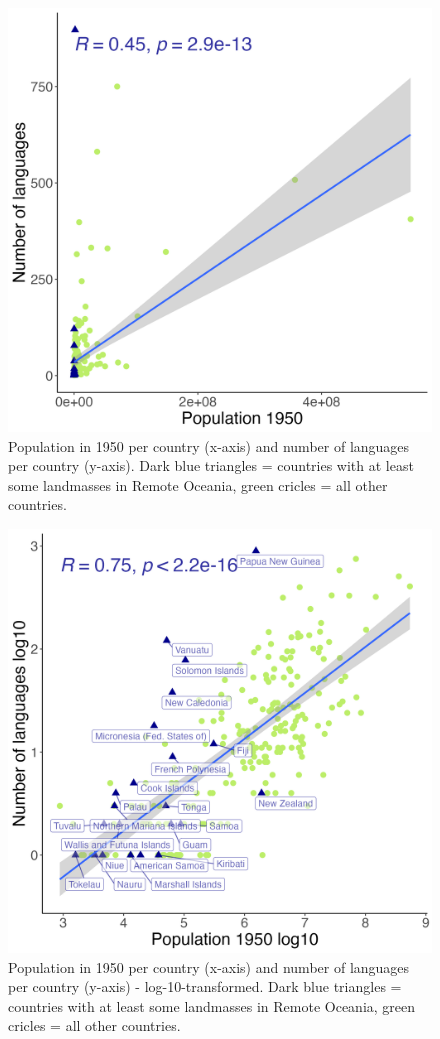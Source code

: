 \documentclass[a4paper,10pt]{article} %
\begin{document}
\begin{figure}[ht]
    \centering
    \includegraphics[width=.8\linewidth]{number_of_languages_vs_pop_1950.png}
    \caption{Population in 1950 per country (x-axis) and number of languages per country (y-axis). Dark blue triangles = countries with at least some landmasses in Remote Oceania, green cricles = all other countries.}
        \label{fig:un_pop_plot}
    \end{figure}
\begin{figure}[ht]
    \centering
          \includegraphics[width=.8\linewidth]{number_of_languages_vs_pop_1950_log10.png}
    \caption{Population in 1950 per country (x-axis) and number of languages per country (y-axis) - log-10-transformed. Dark blue triangles = countries with at least some landmasses in Remote Oceania, green cricles = all other countries.}
    \label{fig:un_pop_plot_log10}
    \end{figure}
    
\end{document}
